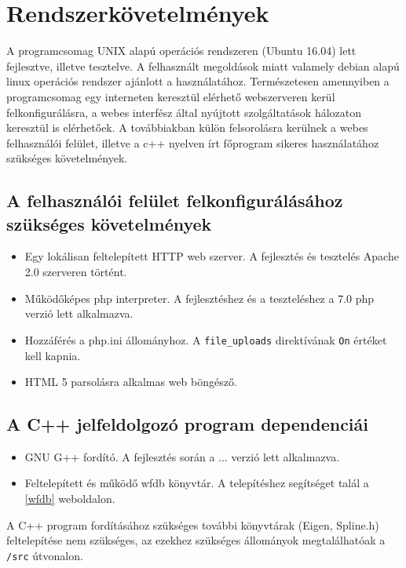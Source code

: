 \documentclass[oneside,titlepage,12pt,a4paper]{report}
\begin{document}
\section{Rendszerkövetelmények}

A programcsomag UNIX alapú operációs rendszeren (Ubuntu 16.04) lett fejlesztve, illetve tesztelve. A felhasznált megoldások miatt valamely debian alapú linux operációs rendszer ajánlott a használatához. Természetesen amennyiben a programcsomag egy interneten keresztül elérhető webszerveren kerül felkonfigurálásra, a webes interfész által nyújtott szolgáltatások hálozaton keresztül is elérhetőek. A továbbiakban külön felsorolásra kerülnek a webes felhasználói felület, illetve a c++ nyelven írt főprogram sikeres használatához szükséges követelmények.

\subsection*{A felhasználói felület felkonfigurálásához szükséges követelmények}

\begin{itemize}
\item Egy lokálisan feltelepített HTTP web szerver. A fejlesztés és tesztelés Apache 2.0 szerveren történt.
\item Működőképes php interpreter. A fejlesztéshez és a teszteléshez a 7.0 php verzió lett alkalmazva. 
\item Hozzáférés a php.ini állományhoz. A \texttt{file_uploads} direktívának \texttt{On} értéket kell kapnia.
\item HTML 5 parsolásra alkalmas web böngésző. 
\end{itemize}

\subsection*{A C++ jelfeldolgozó program dependenciái}

\begin{itemize}
\item GNU G++ fordító. A fejlesztés során a ... verzió lett alkalmazva.
\item Feltelepített és működő wfdb könyvtár. A telepítéshez segítséget talál a \ref{wfdb} weboldalon.
\end{itemize}

A C++ program fordításához szükséges további könyvtárak (Eigen, Spline.h) feltelepítése nem szükséges, az ezekhez szükséges állományok megtalálhatóak a \texttt{/src} útvonalon.
\end{document}

